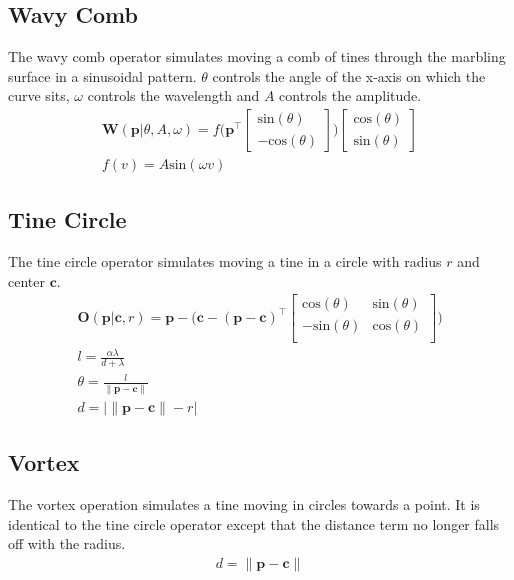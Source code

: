 \documentclass{article}
\newcommand{\cb}{\boldsymbol{c}}
\newcommand{\pb}{\boldsymbol{p}}
\renewcommand{\sin}{\text{sin}}
\renewcommand{\cos}{\text{cos}}
\begin{document}
\subsection{Wavy Comb}
The wavy comb operator simulates moving a comb of tines through the marbling surface in a sinusoidal pattern. $\theta$ controls the angle of the x-axis on which the curve sits, $\omega$ controls the wavelength and $A$ controls the amplitude.
\begin{gather*}
	\boldsymbol{W}(\pb| \theta, A, \omega) = f\bigg(\pb^\top \begin{bmatrix}
	\sin(\theta)\\
	 -\cos(\theta)
	\end{bmatrix}\bigg) \begin{bmatrix}
	\cos(\theta)\\
	 \sin(\theta)
	\end{bmatrix}\\
    f(v) = A \sin(\omega v)
\end{gather*}

\subsection{Tine Circle}
The tine circle operator simulates moving a tine in a circle with radius $r$ and center $\cb$.
\begin{gather*}
	\boldsymbol{O}(\pb | \cb, r) =  \pb - \bigg(\cb - (\pb - \cb) ^ \top \begin{bmatrix}
	\cos(\theta) &\sin(\theta)\\
	-\sin(\theta) &\cos(\theta)\\
	\end{bmatrix} \bigg)\\
	l = \frac{\alpha \lambda}{d + \lambda}\\
	\theta = \frac{l}{\lVert\pb - \cb\rVert}\\
    d = |\lVert \pb - \cb\rVert - r|
\end{gather*}

\subsection{Vortex}
The vortex operation simulates a tine moving in circles towards a point. It is identical to the tine circle operator except that the distance term no longer falls off with the radius.
\begin{gather*}
	d = \lVert\pb - \cb\rVert
\end{gather*}
\end{document}
